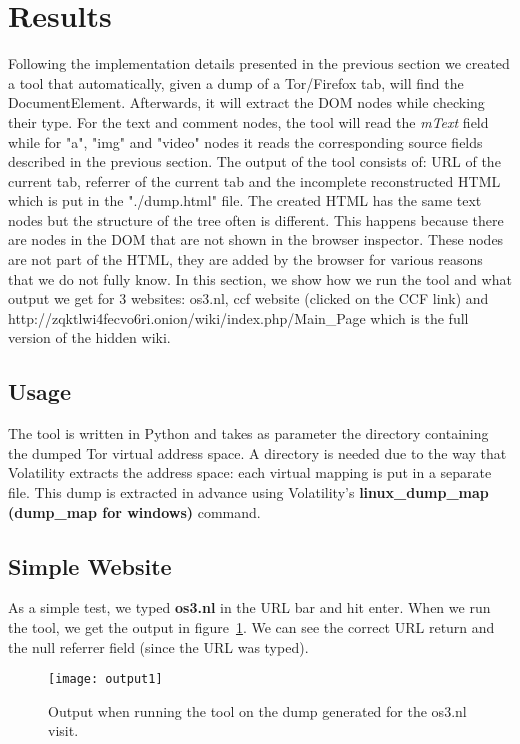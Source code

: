 \section{Results}
\label{sec:results}

Following the implementation details presented in the previous section
we created a tool that automatically, given a dump of a Tor/Firefox
tab, will find the DocumentElement. Afterwards, it will extract the
DOM nodes while checking their type. For the text and comment nodes,
the tool will read the \textit{mText} field while for "a", "img" and
"video" nodes it reads the corresponding source fields described in
the previous section. The output of the tool consists of: URL of the
current tab, referrer of the current tab and the incomplete
reconstructed HTML which is put in the "./dump.html" file. The created
HTML has the same text nodes but the structure of the tree often is
different. This happens because there are nodes in the DOM that are
not shown in the browser inspector. These nodes are not part of the
HTML, they are added by the browser for various reasons that we do not
fully know. In this section, we show how we run the tool and what
output we get for 3 websites: os3.nl\cite{os3nl}, ccf website (clicked
on the CCF link)\cite{os3ccfnl} and
http://zqktlwi4fecvo6ri.onion/wiki/index.php/Main\_Page which is the
full version of the hidden wiki\cite{thehiddenwiki}.

\subsection{Usage}
The tool is written in Python and takes as parameter the directory
containing the dumped Tor virtual address space. A directory is needed
due to the way that Volatility extracts the address space: each
virtual mapping is put in a separate file. This dump is extracted in
advance using Volatility's \textbf{linux\_dump\_map (dump\_map for
  windows)} command.

\subsection{Simple Website}
As a simple test, we typed \textbf{os3.nl} in the URL bar and hit
enter. When we run the tool, we get the output in
figure~\ref{img:output1}. We can see the correct URL return and the
null referrer field (since the URL was typed).

\begin{figure}[h]
  \centering \texttt{[image: output1]}
  \caption{Output when running the tool on the dump generated for the
    os3.nl visit.}
  \label{img:output1}
\end{figure}

